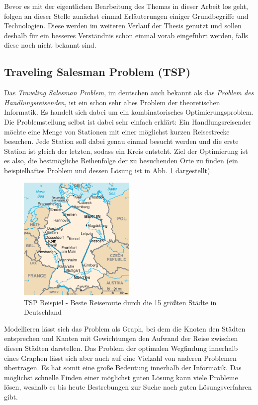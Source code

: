 Bevor es mit der eigentlichen Bearbeitung des Themas in dieser Arbeit los geht, folgen an dieser Stelle zunächst einmal Erläuterungen einiger Grundbegriffe und Technologien. Diese werden im weiteren Verlauf der Thesis genutzt und sollen deshalb für ein besseres Verständnis schon einmal vorab eingeführt werden, falls diese noch nicht bekannt sind.

\subsection{Traveling Salesman Problem (TSP)}
\label{sec:grundlagen_tsp}

Das \textit{Traveling Salesman Problem}, im deutschen auch bekannt als das \textit{Problem des Handlungsreisenden}, ist ein schon sehr altes Problem der theoretischen Informatik. Es handelt sich dabei um ein kombinatorisches Optimierungsproblem. Die Problemstellung selbst ist dabei sehr einfach erklärt: Ein Handlungsreisender möchte eine Menge von Stationen mit einer möglichst kurzen Reisestrecke besuchen. Jede Station soll dabei genau einmal besucht werden und die erste Station ist gleich der letzten, sodass ein Kreis entsteht. Ziel der Optimierung ist es also, die bestmögliche Reihenfolge der zu besuchenden Orte zu finden (ein beispielhaftes Problem und dessen Lösung ist in Abb. \ref{fig:tsp_deutschland} dargestellt). \cite{travelingSalesman}

\begin{figure}[H]
    \centering
    \includegraphics[width=0.5\textwidth]{images/TSP_Deutschland_3.png}
    \caption{TSP Beispiel - Beste Reiseroute durch die 15 größten Städte in Deutschland \cite{tspDeutschland}}
    \label{fig:tsp_deutschland}
\end{figure}

Modellieren lässt sich das Problem als Graph, bei dem die Knoten den Städten entsprechen und Kanten mit Gewichtungen den Aufwand der Reise zwischen diesen Städten darstellen. Das Problem der optimalen Wegfindung innerhalb eines Graphen lässt sich aber auch auf eine Vielzahl von anderen Problemen übertragen. Es hat somit eine große Bedeutung innerhalb der Informatik. Das möglichst schnelle Finden einer möglichst guten Lösung kann viele Probleme lösen, weshalb es bis heute Bestrebungen zur Suche nach guten Lösungsverfahren gibt. \cite{travelingSalesman} 


